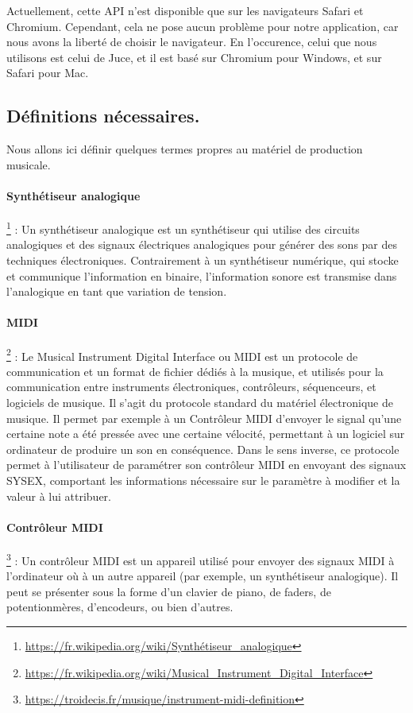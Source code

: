 \documentclass[francais]{rapportPFE}  %
\begin{document}
Actuellement, cette API n'est disponible que sur les navigateurs Safari et Chromium. Cependant, cela ne pose aucun problème pour notre application, car nous avons la liberté de choisir le navigateur. En l'occurence, celui que nous utilisons est celui de Juce, et il est basé sur Chromium pour Windows, et sur Safari pour Mac.

\subsection{Définitions nécessaires.}

Nous allons ici définir quelques termes propres au matériel de production musicale.
\paragraph{Synthétiseur analogique} \footnote{\url{https://fr.wikipedia.org/wiki/Synthétiseur_analogique}} 
:
 Un synthétiseur analogique est un synthétiseur qui utilise des circuits analogiques et des signaux électriques analogiques pour générer des sons par des techniques électroniques. Contrairement à un synthétiseur numérique, qui stocke et communique l'information en binaire, l'information sonore est transmise dans l'analogique en tant que variation de tension.
\paragraph{MIDI} \footnote{\url{https://fr.wikipedia.org/wiki/Musical_Instrument_Digital_Interface}} 
: Le Musical Instrument Digital Interface ou MIDI est un protocole de communication et un format de fichier dédiés à la musique, et utilisés pour la communication entre instruments électroniques, contrôleurs, séquenceurs, et logiciels de musique. Il s'agit du protocole standard du matériel électronique de musique. Il permet par exemple à un Contrôleur MIDI d'envoyer le signal qu'une certaine note a été pressée avec une certaine vélocité, permettant à un logiciel sur ordinateur de produire un son en conséquence. Dans le sens inverse, ce protocole permet à l'utilisateur de paramétrer son contrôleur MIDI en envoyant des signaux SYSEX, comportant les informations nécessaire sur le paramètre à modifier et la valeur à lui attribuer.
\paragraph{Contrôleur MIDI} \footnote{\url{https://troidecis.fr/musique/instrument-midi-definition}} 
:  Un contrôleur MIDI est un appareil utilisé pour envoyer des signaux MIDI à l'ordinateur où à un autre appareil (par exemple, un synthétiseur analogique). Il peut se présenter sous la forme d'un clavier de piano, de faders, de potentionmères, d'encodeurs, ou bien d'autres.
\end{document}
